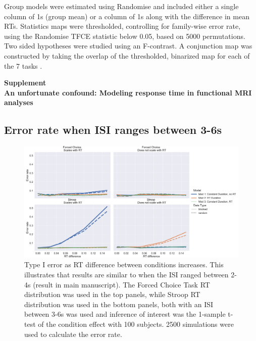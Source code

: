 \documentclass[titlepage,12pt] {article}
\newcommand{\beginsupplement}{%
        \setcounter{table}{0}
        \renewcommand{\thetable}{S\arabic{table}}%
        \setcounter{figure}{0}
        \renewcommand{\thefigure}{S\arabic{figure}}%
     }
\begin{document}
Group models were estimated using Randomise \citep{smith2009} and included either a single column of 1s (group mean) or a column of 1s along with the difference in mean RTs. Statistics maps were thresholded, controlling for family-wise error rate, using the Randomise TFCE statistic below 0.05, based on 5000 permutations.  Two sided hypotheses were studied using an F-contrast.  A conjunction map was constructed by taking the overlap of the thresholded, binarized map for each of the 7 tasks \citep{nichols_valid_2005}.





\newpage
\beginsupplement

\begin{center}
{\large\textbf{Supplement \\ An unfortunate confound: Modeling response time in functional MRI analyses
}}
\end{center}


\subsection*{Error rate when ISI ranges between 3-6s}
\begin{figure}[h!]
  \centering
   \includegraphics[width=5in]{Figures/type1_err_36.pdf}
   \caption{Type I error as RT difference between conditions increases.  This illustrates that results are similar to when the ISI ranged between 2-4s (result in main manuscript).  The Forced Choice Task RT distribution was used in the top panels, while Stroop RT distribution was used in the bottom panels, both with an ISI between 3-6s was used and inference of interest was the 1-sample t-test of the condition effect with 100 subjects.  2500 simulations were used to calculate the error rate.}
  \label{fig:type1err_36}
\end{figure}
\end{document}
